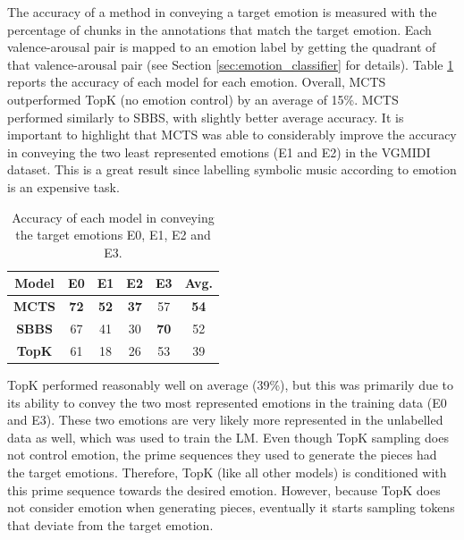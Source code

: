 The accuracy of a method in conveying a target emotion is measured with the percentage of chunks in the annotations that match the target emotion. Each valence-arousal pair is mapped to an emotion label by getting the quadrant of that valence-arousal pair (see Section \ref{sec:emotion_classifier} for details).  Table \ref{tab:emotion} reports the accuracy of each model for each emotion. Overall, MCTS outperformed TopK (no emotion control) by an average of 15\%. MCTS performed similarly to SBBS, with slightly better average accuracy. It is important to highlight that MCTS was able to considerably improve the accuracy in conveying the two least represented emotions (E1 and E2) in the VGMIDI dataset. This is a great result since labelling symbolic music according to emotion is an expensive task.

\begin{table}[h]
    \centering
    \begin{tabular}{cccccc}
    \toprule
    \textbf{Model} & \textbf{E0} & \textbf{E1}  & \textbf{E2} & \textbf{E3} & \textbf{Avg.} \\
    \midrule
    \textbf{MCTS} & \textbf{72} & \textbf{52} & \textbf{37} & 57 & \textbf{54} \\
    \textbf{SBBS} & 67 & 41 & 30 & \textbf{70} & 52 \\
    \textbf{TopK} & 61 & 18 & 26 & 53 & 39 \\
    \bottomrule
    \end{tabular}
    \caption{Accuracy of each model in conveying the target emotions E0, E1, E2 and E3. }
    \label{tab:emotion}
\end{table}

TopK performed reasonably well on average (39\%), but this was primarily due to its ability to convey the two most represented emotions in the training data (E0 and E3). These two emotions are very likely more represented in the unlabelled data as well, which was used to train the LM. Even though TopK sampling does not control emotion, the prime sequences they used to generate the pieces had the target emotions. Therefore, TopK (like all other models) is conditioned with this prime sequence towards the desired emotion. However, because TopK does not consider emotion when generating pieces, eventually it starts sampling tokens that deviate from the target emotion.

